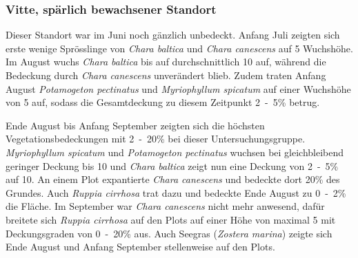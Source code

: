\subsubsection{Vitte, spärlich bewachsener Standort}


Dieser Standort war im Juni noch gänzlich unbedeckt. Anfang Juli zeigten sich erste wenige Sprösslinge von \textit{Chara baltica} und \textit{Chara canescens} auf \unit{5}{\centi\metre} Wuchshöhe. Im August wuchs \textit{Chara baltica} bis auf durchschnittlich \unit{10}{\centi\metre} auf, während die Bedeckung durch \textit{Chara canescens} unverändert blieb. Zudem traten Anfang August \textit{Potamogeton pectinatus} und \textit{Myriophyllum spicatum} auf einer Wuchshöhe von \unit{5}{\centi\metre} auf, sodass die Gesamtdeckung zu diesem Zeitpunkt \unit{2-5}{\%} betrug. 

Ende August bis Anfang September zeigten sich die höchsten Vegetationsbedeckungen mit \unit{2-20}{\%} bei dieser Untersuchungsgruppe. \textit{Myriophyllum spicatum} und \textit{Potamogeton pectinatus} wuchsen bei gleichbleibend geringer Deckung bis \unit{10}{\centi\metre} und \textit{Chara baltica} zeigt nun eine Deckung von \unit{2-5}{\%} auf \unit{10}{\centi\metre}. An einem Plot expantierte \textit{Chara canescens} und bedeckte dort \unit{20}{\%} des Grundes. Auch \textit{Ruppia cirrhosa} trat dazu und bedeckte Ende August zu \unit{0-2}{\%} die Fläche. Im September war \textit{Chara canescens} nicht mehr anwesend, dafür breitete sich \textit{Ruppia cirrhosa} auf den Plots auf einer Höhe von maximal \unit{5}{\centi\metre} mit Deckungsgraden von \unit{0-20}{\%} aus. Auch Seegras (\textit{Zostera marina}) zeigte sich Ende August und Anfang September stellenweise auf den Plots.

